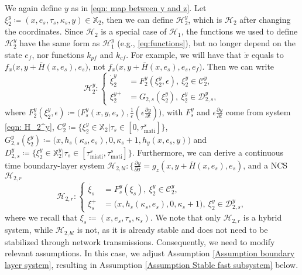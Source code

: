 We again define $y$ as in \eqref{eqn: map between y and z}.
Let $\xi_2^y \coloneqq (x,e_s,\tau_s, \kappa_s,y) \in \mathbb{X}_2$,
then we can define $\mathcal{H}_2^y$, which is $\mathcal{H}_2$ after changing the coordinates. Since $\mathcal{H}_2$ is a special case of $\mathcal{H}_1$, the functions we used to define $\mathcal{H}_2^y$ have the same form as $\mathcal{H}_1^y$ (e.g., \eqref{eq:functions}), but no longer depend on the state $e_f$, nor functions $k_{pf}$ and $k_{cf}$. For example, we will have that $\dot x$ equals to $f_x\big(x,y+\overline{H}(x,e_s), e_s\big)$, not $f_x\big(x,y+\overline{H}(x,e_s), e_s, e_f\big)$. Then we can write
\begin{equation*}
    \mathcal{H}_2^y:\left\{
\begin{aligned}
    \dot{\xi}_2^y &= F_2^y(\xi_2^y, \epsilon),\ \xi_2^y \in \mathcal{C}_2^y, \\
    {\xi_2^y}^+ &= G_{2,s}(\xi_2^y), \ \xi_2^y \in \mathcal{D}_{2,s}^y,
\end{aligned}
    \right.
\end{equation*}
where $F_2^y(\xi_2^y, \epsilon) \coloneqq \big(F_s^y(x,y,e_s), \tfrac{1}{\epsilon} (\epsilon \tfrac{\partial y}{\partial t})  \big)$, with $F_s^y$ and $\epsilon \tfrac{\partial y}{\partial t}$ come from system \eqref{eqn: H_2^y}, $C_2^y \coloneqq \{ \xi_2^y \in \mathbb{X}_2 | \tau_s \in [0, \tau_{\text{mati}}^s]\}$, $G_{2,s}^y(\xi_2^y) \coloneqq \big(x, h_s(\kappa_s, e_s), 0, \kappa_s + 1, h_y(x,e_s,y)\big)$ and $D_{2,s}^y \coloneqq \{ \xi_2^y \in \mathbb{X}_2^y | \tau_s \in [\tau_{\text{miati}}^s, \tau_{\text{mati}}^s]\}$.
%
Furthermore, we can derive a continuous time boundary-layer system $\mathcal{H}_{2,bl} : \{
        \tfrac{\partial y}{\partial \sigma} = g_z(x,y+\overline{H}(x,e_s),e_s)
        $,
and a NCS $\mathcal{H}_{2,r}$ 
\begin{equation*}
    \mathcal{H}_{2,r}:\left\{
\begin{aligned}
    \dot{\xi_s} &= F_s^y(\xi_s),\ \xi_2^y \in \mathcal{C}_2^y, \\
    \xi_s^+ &= \big(x,h_s(\kappa_s, e_s), 0, \kappa_s + 1\big), \ \xi_2^y\in \mathcal{D}_{2,s}^y,
\end{aligned}
    \right.    
\end{equation*}
where we recall that $\xi_s \coloneqq (x,e_s,\tau_s, \kappa_s)$.
%
We note that only $\mathcal{H}_{2,r}$ is a hybrid system, while $\mathcal{H}_{2,bl}$ is not, as it is already stable and does not need to be stabilized through network transmissions. Consequently, we need to modify relevant assumptions. In this case, we adjust Assumption \ref{Assumption boundary layer system}, resulting in Assumption \ref{Assumption Stable fast subsystem} below. 

